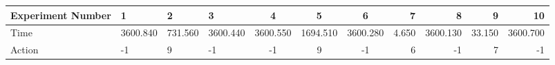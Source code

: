\documentclass[8pt]{article}
\begin{document}
\begin{landscape}
\begin{tabular}{ | l | l | l | l | c | c | c | r | r | r | r | }
 \hline 
Experiment Number & 1 & 2 & 3 & 4 & 5 & 6 & 7 & 8 & 9 & 10\\ \hline
Time & 3600.840 & 731.560 & 3600.440 & 3600.550 & 1694.510 & 3600.280 & 4.650 & 3600.130 & 33.150 & 3600.700\\ \hline
Action & -1 & 9 & -1 & -1 & 9 & -1 & 6 & -1 & 7 & -1\\ \hline\end{tabular}
\end{landscape}
\end{document}
